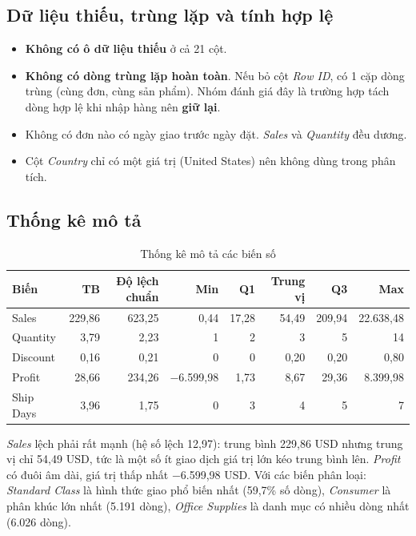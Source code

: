\documentclass[12pt,a4paper]{article}
\begin{document}
\subsection{Dữ liệu thiếu, trùng lặp và tính hợp lệ}
\begin{itemize}
  \item \textbf{Không có ô dữ liệu thiếu} ở cả 21 cột.
  \item \textbf{Không có dòng trùng lặp hoàn toàn}. Nếu bỏ cột \textit{Row ID}, có 1 cặp dòng trùng (cùng đơn, cùng sản phẩm).
        Nhóm đánh giá đây là trường hợp tách dòng hợp lệ khi nhập hàng nên \textbf{giữ lại}.
  \item Không có đơn nào có ngày giao trước ngày đặt. \textit{Sales} và \textit{Quantity} đều dương.
  \item Cột \textit{Country} chỉ có một giá trị (United States) nên không dùng trong phân tích.
\end{itemize}

\subsection{Thống kê mô tả}
\begin{table}[H]
\centering
\caption{Thống kê mô tả các biến số}\label{tab:thongke}
\begin{tabular}{@{}lrrrrrrr@{}}
\toprule
\textbf{Biến} & \textbf{TB} & \textbf{Độ lệch chuẩn} & \textbf{Min} & \textbf{Q1} & \textbf{Trung vị} & \textbf{Q3} & \textbf{Max} \\
\midrule
Sales     & 229,86 & 623,25 & 0,44     & 17,28 & 54,49 & 209,94 & 22.638,48 \\
Quantity  & 3,79   & 2,23   & 1        & 2     & 3     & 5      & 14 \\
Discount  & 0,16   & 0,21   & 0        & 0     & 0,20  & 0,20   & 0,80 \\
Profit    & 28,66  & 234,26 & −6.599,98 & 1,73 & 8,67  & 29,36  & 8.399,98 \\
Ship Days & 3,96   & 1,75   & 0        & 3     & 4     & 5      & 7 \\
\bottomrule
\end{tabular}
\end{table}
\textit{Sales} lệch phải rất mạnh (hệ số lệch 12,97): trung bình 229,86 USD nhưng trung vị chỉ 54,49 USD,
tức là một số ít giao dịch giá trị lớn kéo trung bình lên. \textit{Profit} có đuôi âm dài, giá trị thấp nhất
−6.599,98 USD. Với các biến phân loại: \textit{Standard Class} là hình thức giao phổ biến nhất (59,7\% số dòng),
\textit{Consumer} là phân khúc lớn nhất (5.191 dòng), \textit{Office Supplies} là danh mục có nhiều dòng nhất (6.026 dòng).
\end{document}
